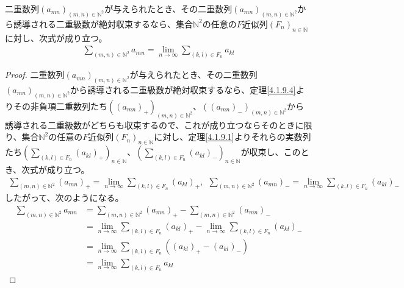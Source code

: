 \documentclass[dvipdfmx]{jsarticle}
\begin{document}
\begin{thm}\label{4.1.9.5}
二重数列$\left( a_{mn} \right)_{(m,n) \in \mathbb{N}^{2}}$が与えられたとき、その二重数列$\left( a_{mn} \right)_{(m,n) \in \mathbb{N}^{2}}$から誘導される二重級数が絶対収束するなら、集合$\mathbb{N}^{2}$の任意の$F$近似列$\left( F_{n} \right)_{n \in \mathbb{N}}$に対し、次式が成り立つ。
\begin{align*}
\sum_{(m,n) \in \mathbb{N}^{2}}a_{mn} = \lim_{n \rightarrow \infty}{\sum_{(k,l) \in F_{n}}a_{kl}}
\end{align*}
\end{thm}
\begin{proof}
二重数列$\left( a_{mn} \right)_{(m,n) \in \mathbb{N}^{2}}$が与えられたとき、その二重数列$\left( a_{mn} \right)_{(m,n) \in \mathbb{N}^{2}}$から誘導される二重級数が絶対収束するなら、定理\ref{4.1.9.4}よりその非負項二重数列たち$\left( \left( a_{mn} \right)_{+} \right)_{(m,n) \in \mathbb{N}^{2}}$、$\left( \left( a_{mn} \right)_{-} \right)_{(m,n) \in \mathbb{N}^{2}}$から誘導される二重級数がどちらも収束するので、これが成り立つならそのときに限り、集合$\mathbb{N}^{2}$の任意の$F$近似列$\left( F_{n} \right)_{n \in \mathbb{N}}$に対し、定理\ref{4.1.9.1}よりそれらの実数列たち$\left( \sum_{(k,l) \in F_{n}}\left( a_{kl} \right)_{+} \right)_{n \in \mathbb{N}}$、$\left( \sum_{(k,l) \in F_{n}}\left( a_{kl} \right)_{-} \right)_{n \in \mathbb{N}}$が収束し、このとき、次式が成り立つ。
\begin{align*}
\sum_{(m,n) \in \mathbb{N}^{2}}\left( a_{mn} \right)_{+} = \lim_{n \rightarrow \infty}{\sum_{(k,l) \in F_{n}}\left( a_{kl} \right)_{+}},\ \ \sum_{(m,n) \in \mathbb{N}^{2}}\left( a_{mn} \right)_{-} = \lim_{n \rightarrow \infty}{\sum_{(k,l) \in F_{n}}\left( a_{kl} \right)_{-}}
\end{align*}
したがって、次のようになる。
\begin{align*}
\sum_{(m,n) \in \mathbb{N}^{2}}a_{mn} &= \sum_{(m,n) \in \mathbb{N}^{2}}\left( a_{mn} \right)_{+} - \sum_{(m,n) \in \mathbb{N}^{2}}\left( a_{mn} \right)_{-}\\
&= \lim_{n \rightarrow \infty}{\sum_{(k,l) \in F_{n}}\left( a_{kl} \right)_{+}} - \lim_{n \rightarrow \infty}{\sum_{(k,l) \in F_{n}}\left( a_{kl} \right)_{-}}\\
&= \lim_{n \rightarrow \infty}{\sum_{(k,l) \in F_{n}}\left( \left( a_{kl} \right)_{+} - \left( a_{kl} \right)_{-} \right)}\\
&= \lim_{n \rightarrow \infty}{\sum_{(k,l) \in F_{n}}a_{kl}}
\end{align*}
\end{proof}
\end{document}

